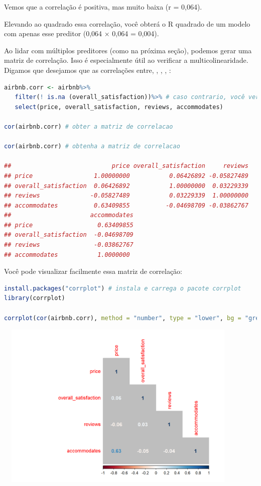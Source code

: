 \documentclass{article}
\begin{document}
Vemos que a correlação é positiva, mas muito baixa (r = 0,064).

Elevando ao quadrado essa correlação, você obterá o R quadrado de um modelo com apenas esse preditor (0,064 × 0,064 = 0,004).

Ao lidar com múltiplos preditores (como na próxima seção), podemos gerar uma matriz de correlação. Isso é especialmente útil ao verificar a multicolinearidade. Digamos que desejamos que as correlações entre, , , , :

\begin{lstlisting}[language=R]
airbnb.corr <- airbnb%>%
   filter(! is.na (overall_satisfaction))%>% # caso contrario, você vera NAs no resultado
   select(price, overall_satisfaction, reviews, accommodates)

cor(airbnb.corr) # obter a matriz de correlacao

cor(airbnb.corr) # obtenha a matriz de correlacao

##                            price overall_satisfaction     reviews
## price                 1.00000000           0.06426892 -0.05827489
## overall_satisfaction  0.06426892           1.00000000  0.03229339
## reviews              -0.05827489           0.03229339  1.00000000
## accommodates          0.63409855          -0.04698709 -0.03862767
##                      accommodates
## price                  0.63409855
## overall_satisfaction  -0.04698709
## reviews               -0.03862767
## accommodates           1.0000000
\end{lstlisting}

\newpage

Você pode visualizar facilmente essa matriz de correlação:

\begin{lstlisting}[language=R]
install.packages("corrplot") # instala e carrega o pacote corrplot
library(corrplot)

corrplot(cor(airbnb.corr), method = "number", type = "lower", bg = "grey") # apresente numa tabela
\end{lstlisting}


\begin{center}
\includegraphics[width=12cm,height=8cm]{modelling_matrix2-1.png} 
\end{center}
\end{document}
